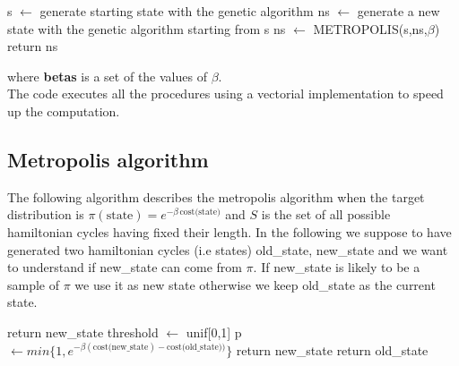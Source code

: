 \documentclass{article}
\begin{document}
\begin{algorithm}[H]
    \begin{algorithmic}[1]
        \State s $\leftarrow$ generate starting state with the genetic algorithm
         	 \State ns $\leftarrow$ generate a new state with the genetic algorithm starting from s
         	\State ns $\leftarrow$ METROPOLIS(s,ns,$\beta$)
         	\EndFor
        \EndFor
        \State return ns
       \EndFunction
\end{algorithmic}
\end{algorithm}

\noindent where \textbf{betas} is a set of the values of $\beta$. \\ 
The code executes all the procedures using a vectorial implementation to speed up the computation.

\subsection{Metropolis algorithm}

The following algorithm describes the metropolis algorithm when the target distribution is $\pi(\text{state}) = e^{- \beta \, \text{cost(state)}}$ and $S$ is the set of all possible hamiltonian cycles having fixed their length. In the following we suppose to have generated two hamiltonian cycles (i.e states) old\_state, new\_state and we want to understand if new\_state can come from $\pi$. If new\_state is likely to be a sample of $\pi$ we use it as new state otherwise we keep old\_state as the current state.

\begin{algorithm}[H]
    \begin{algorithmic}[1]
      	\State return new\_state
      	\EndIf
        \State threshold $\leftarrow$ unif[0,1]
        \State p  $\leftarrow min\{1,e^{- \beta (\text{cost(new\_state}) - \text{cost(old\_state}))} \}$ 
        	\State return new\_state
        \Else
        	\State return old\_state
        \EndIf
       \EndFunction
\end{algorithmic}
\end{algorithm}
\noindent
\end{document}
